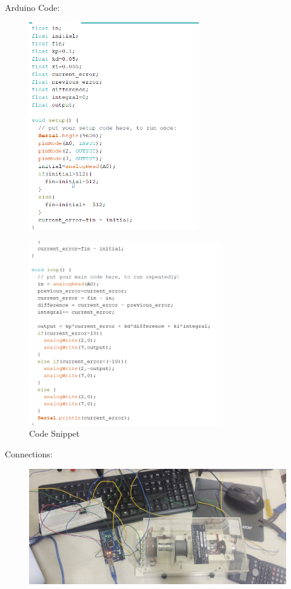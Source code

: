 \documentclass[12pt]{report}
\begin{document}
\newpage

Arduino Code:\\

\begin{figure}[h!]
\center
\includegraphics[width=210pt]{Code1.png}
\end{figure}

\begin{figure}[h!]
\center
\includegraphics[width=240pt]{Code2.png}
\caption{Code Snippet}
\end{figure}

\newpage

Connections: \\

\vspace{50pt}

\begin{figure}[h!]
\center
\includegraphics[width=400pt]{Circuit1.jpeg}
\end{figure}
\end{document}
